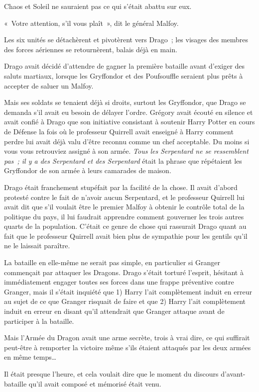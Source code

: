 Chaos et Soleil ne sauraient pas ce qui s'était abattu sur eux.

«~Votre attention, s'il vous plaît~», dit le général Malfoy.

Les six unités se détachèrent et pivotèrent vers Drago~; les visages des membres des forces aériennes se retournèrent, balais déjà en main.

Drago avait décidé d'attendre de gagner la première bataille avant d'exiger des saluts martiaux, lorsque les Gryffondor et des Poufsouffle seraient plus prêts à accepter de saluer un Malfoy.

Mais ses soldats se tenaient déjà si droits, surtout les Gryffondor, que Drago se demanda s'il avait eu besoin de délayer l'ordre.
Grégory avait écouté en silence et avait confié à Drago que son initiative consistant à soutenir Harry Potter en cours de Défense la fois où le professeur Quirrell avait enseigné à Harry comment perdre lui avait déjà valu d'être reconnu comme un chef acceptable.
Du moins si vous vous retrouviez assigné à son armée.
\emph{Tous les Serpentard ne se ressemblent pas~; il y a des Serpentard et des Serpentard} était la phrase que répétaient les Gryffondor de son armée à leurs camarades de maison.

Drago était franchement stupéfait par la facilité de la chose.
Il avait d'abord protesté contre le fait de n'avoir aucun Serpentard, et le professeur Quirrell lui avait dit que s'il voulait être le premier Malfoy à obtenir le contrôle total de la politique du pays, il lui faudrait apprendre comment gouverner les trois autres quarts de la population.
C'était ce genre de chose qui rassurait Drago quant au fait que le professeur Quirrell avait bien plus de sympathie pour les gentils qu'il ne le laissait paraître.

La bataille en elle-même ne serait pas simple, en particulier si Granger commençait par attaquer les Dragons.
Drago s'était torturé l'esprit, hésitant à immédiatement engager toutes ses forces dans une frappe préventive contre Granger, mais il s'était inquiété que 1) Harry l'ait complètement induit en erreur au sujet de ce que Granger risquait de faire et que 2) Harry l'ait complètement induit en erreur en disant qu'il attendrait que Granger attaque avant de participer à la bataille.

Mais l'Armée du Dragon avait une arme secrète, trois à vrai dire, ce qui suffirait peut-être à remporter la victoire même s'ils étaient attaqués par les deux armées en même temps…

Il était presque l'heure, et cela voulait dire que le moment du discours d'avant-bataille qu'il avait composé et mémorisé était venu.

